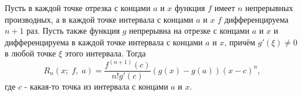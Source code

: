 

\label{sec_Definition17}
\begin{definition}
    Пусть в каждой точке отрезка с концами $a$ и $x$ функция $f$ имеет $n$ непрерывных
    производных, а в каждой точке интервала с концами $a$ и $x$ $f$ дифференцируема $n + 1$ раз.
    Пусть также функция $g$ непрерывна на отрезке с концами $a$ и $x$ и дифференцируема в каждой 
    точке интервала с концами $a$ и $x$, причём $g'(\xi) \neq 0$ в любой точке $\xi$ этого 
    интервала. Тогда 
    $$ R_n (x; \; f, \; a) = \frac{f^{(n + 1)} (c)}{n! g'(c)} (g(x) - g(a))(x - c)^n, $$
    где $c$ - какая-то точка из интервала с концами $a$ и $x$.
\end{definition}